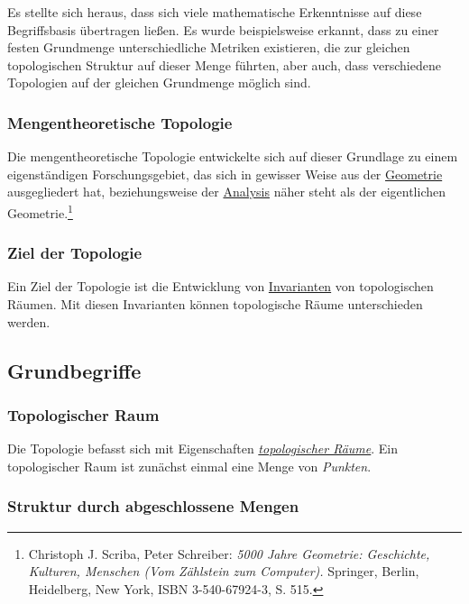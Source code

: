 \documentclass[12pt,]{article}
\begin{document}
Es stellte sich heraus, dass sich viele mathematische Erkenntnisse auf
diese Begriffsbasis übertragen ließen. Es wurde beispielsweise erkannt,
dass zu einer festen Grundmenge unterschiedliche Metriken existieren,
die zur gleichen topologischen Struktur auf dieser Menge führten, aber
auch, dass verschiedene Topologien auf der gleichen Grundmenge möglich
sind.

\subsubsection{Mengentheoretische
Topologie}\label{mengentheoretische-topologie}

Die mengentheoretische Topologie entwickelte sich auf dieser Grundlage
zu einem eigenständigen Forschungsgebiet, das sich in gewisser Weise aus
der \url{Geometrie} ausgegliedert hat, beziehungsweise der
\url{Analysis} näher steht als der eigentlichen Geometrie.\footnote{Christoph
  J. Scriba, Peter Schreiber: \emph{5000 Jahre Geometrie: Geschichte,
  Kulturen, Menschen (Vom Zählstein zum Computer).} Springer, Berlin,
  Heidelberg, New York, ISBN 3-540-67924-3, S. 515.}

\subsubsection{Ziel der Topologie}\label{ziel-der-topologie}

Ein Ziel der Topologie ist die Entwicklung von
\href{Invariante_(Mathematik)}{Invarianten} von topologischen Räumen.
Mit diesen Invarianten können topologische Räume unterschieden werden.

\subsection{Grundbegriffe}\label{grundbegriffe}

\subsubsection{Topologischer Raum}\label{topologischer-raum}

 Die Topologie befasst sich mit Eigenschaften
\emph{\href{Topologischer_Raum}{topologischer Räume}}. Ein topologischer
Raum ist zunächst einmal eine Menge von \emph{Punkten}.

\subsubsection{Struktur durch abgeschlossene
Mengen}\label{struktur-durch-abgeschlossene-mengen}
\end{document}
